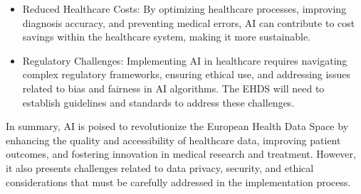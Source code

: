 \begin{itemize}
\item Reduced Healthcare Costs: By optimizing healthcare processes, improving diagnosis accuracy, and preventing medical errors, AI can contribute to cost savings within the healthcare system, making it more sustainable.

\item Regulatory Challenges: Implementing AI in healthcare requires navigating complex regulatory frameworks, ensuring ethical use, and addressing issues related to bias and fairness in AI algorithms. The EHDS will need to establish guidelines and standards to address these challenges.

\end{itemize}


In summary, AI is poised to revolutionize the European Health Data Space by enhancing the quality and accessibility of healthcare data, improving patient outcomes, and fostering innovation in medical research and treatment. However, it also presents challenges related to data privacy, security, and ethical considerations that must be carefully addressed in the implementation process.